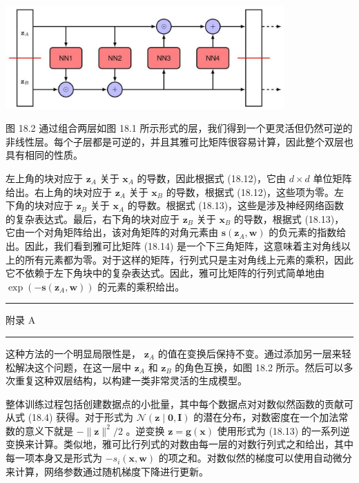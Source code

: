 \documentclass[10pt]{report}
\newcommand{\HRule}{\begin{center}\rule{0.9\linewidth}{0.2mm}\end{center}}
\begin{document}
\begin{center}
\includegraphics[max width=0.8\textwidth]{images/0194e279-9b28-703a-88f4-c3ac21e2010d_570_316_342_1098_408_0.jpg}
\end{center}
\hspace*{3em} 

图 18.2 通过组合两层如图 18.1 所示形式的层，我们得到一个更灵活但仍然可逆的非线性层。每个子层都是可逆的，并且其雅可比矩阵很容易计算，因此整个双层也具有相同的性质。

左上角的块对应于 \({\mathbf{z}}_{A}\) 关于 \({\mathbf{x}}_{A}\) 的导数，因此根据式 (18.12)，它由 \(d \times  d\) 单位矩阵给出。右上角的块对应于 \({\mathbf{z}}_{A}\) 关于 \({\mathbf{x}}_{B}\) 的导数，根据式 (18.12)，这些项为零。左下角的块对应于 \({\mathbf{z}}_{B}\) 关于 \({\mathbf{x}}_{A}\) 的导数。根据式 (18.13)，这些是涉及神经网络函数的复杂表达式。最后，右下角的块对应于 \({\mathbf{z}}_{B}\) 关于 \({\mathbf{x}}_{B}\) 的导数，根据式 (18.13)，它由一个对角矩阵给出，该对角矩阵的对角元素由 \(\mathbf{s}\left( {{\mathbf{z}}_{A},\mathbf{w}}\right)\) 的负元素的指数给出。因此，我们看到雅可比矩阵 (18.14) 是一个下三角矩阵，这意味着主对角线以上的所有元素都为零。对于这样的矩阵，行列式只是主对角线上元素的乘积，因此它不依赖于左下角块中的复杂表达式。因此，雅可比矩阵的行列式简单地由 \(\exp \left( {-\mathbf{s}\left( {{\mathbf{z}}_{A},\mathbf{w}}\right) }\right)\) 的元素的乘积给出。

\HRule

附录 A

\HRule

这种方法的一个明显局限性是， \({\mathbf{z}}_{A}\) 的值在变换后保持不变。通过添加另一层来轻松解决这个问题，在这一层中 \({\mathbf{z}}_{A}\) 和 \({\mathbf{z}}_{B}\) 的角色互换，如图 18.2 所示。然后可以多次重复这种双层结构，以构建一类非常灵活的生成模型。

整体训练过程包括创建数据点的小批量，其中每个数据点对对数似然函数的贡献可从式 (18.4) 获得。对于形式为 \(\mathcal{N}\left( {\mathbf{z} \mid  \mathbf{0},\mathbf{I}}\right)\) 的潜在分布，对数密度在一个加法常数的意义下就是 \(- \parallel \mathbf{z}{\parallel }^{2}/2\) 。逆变换 \(\mathbf{z} = \mathbf{g}\left( \mathbf{x}\right)\) 使用形式为 (18.13) 的一系列逆变换来计算。类似地，雅可比行列式的对数由每一层的对数行列式之和给出，其中每一项本身又是形式为 \(- {s}_{i}\left( {\mathbf{x},\mathbf{w}}\right)\) 的项之和。对数似然的梯度可以使用自动微分来计算，网络参数通过随机梯度下降进行更新。
\end{document}
